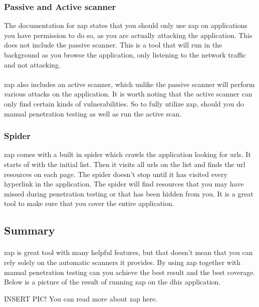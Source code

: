 \documentclass[11pt,english,a4paper]{report}
\begin{document}
\subsubsection{Passive and Active scanner}
The documentation for \gls{zap} states that you should only use \gls{zap} on applications you have permission to do so, as you are actually attacking the application. 
This does not include the passive scanner. 
This is a tool that will run in the background as you browse the application, only listening to the network traffic and not attacking. 

\paragraph{}
\gls{zap} also includes an active scanner, which unlike the passive scanner will perform various attacks on the application. 
It is worth noting that the active scanner can only find certain kinds of vulnerabilities. 
So to fully utilize zap, should you do manual penetration testing as well as run the active scan.

\subsubsection{Spider}
\gls{zap} comes with a built in spider which crawls the application looking for \glspl{url}.
It starts of with the initial list. 
Then it visits all \glspl{url} on the list and finds the \gls{url} resources on each page. 
The spider doesn't stop until it has visited every hyperlink in the application.
The spider will find resources that you may have missed during penetration testing or that has been hidden from you. 
It is a great tool to make sure that you cover the entire application.

\subsection{Summary}
\paragraph{}
\gls{zap} is great tool with many helpful features, but that doesn't mean that you can rely solely on the automatic scanners it provides. 
By using \gls{zap} together with manual penetration testing can you achieve the best result and the best coverage. 
Below is a picture of the result of running \gls{zap} on the \gls{dhis} application.

INSERT PIC!
You can read more about \gls{zap} here. \cite{zap-documentation,zap-homepage}
\newpage
\end{document}
